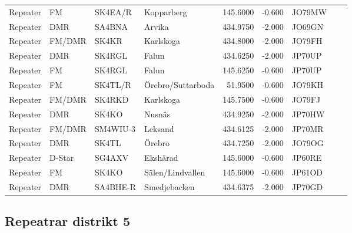 \begin{longtable}{llllrrlcl}
	Repeater & FM         & SK4EA/R  & Kopparberg                 &   145.6000 &   -0.600 & JO79MW &  &  \\
	Repeater & DMR        & SA4BNA   & Arvika                     &   434.9750 &   -2.000 & JO69GN &  &  \\
	Repeater & FM/DMR     & SK4KR    & Karlskoga                  &   434.8000 &   -2.000 & JO79FH &  &  \\
	Repeater & DMR        & SK4RGL   & Falun                      &   434.6250 &   -2.000 & JP70UP &  &  \\
	Repeater & FM         & SK4RGL   & Falun                      &   145.6250 &   -0.600 & JP70UP &  &  \\
	Repeater & FM         & SK4TL/R  & Örebro/Suttarboda          &    51.9500 &   -0.600 & JO79KH &  &  \\
	Repeater & FM/DMR     & SK4RKD   & Karlskoga                  &   145.7500 &   -0.600 & JO79FJ &  &  \\
	Repeater & DMR        & SK4KO    & Nusnäs                     &   434.9250 &   -2.000 & JP70HW &  &  \\
	Repeater & FM/DMR     & SM4WIU-3 & Leksand                    &   434.6125 &   -2.000 & JP70MR &  &  \\
	Repeater & DMR        & SK4TL    & Örebro                     &   434.7250 &   -2.000 & JO79OG &  &  \\
	Repeater & D-Star     & SG4AXV   & Ekshärad                   &   145.6000 &   -0.600 & JP60RE &  &  \\
	Repeater & FM         & SK4KO    & Sälen/Lindvallen           &   145.6000 &   -0.600 & JP61OD &  &  \\
	Repeater & DMR        & SA4BHE-R & Smedjebacken               &   434.6375 &   -2.000 & JP70GD &  &
\end{longtable}

\subsection{Repeatrar distrikt 5}

